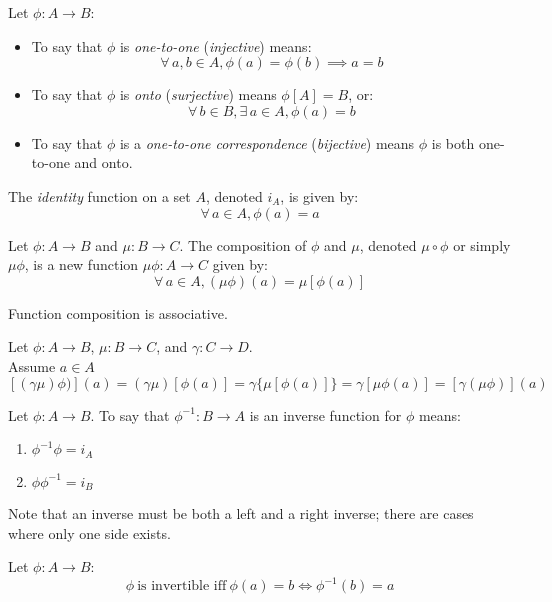 \documentclass[letterpaper,12pt,fleqn]{article}
\begin{document}
\begin{definition}
Let $\phi:A\to B$:
\begin{itemize}
\item To say that $\phi$ is \emph{one-to-one} (\emph{injective}) means:
\[\forall\,a,b\in A,\phi(a)=\phi(b)\implies a=b\]
\item To say that $\phi$ is \emph{onto} (\emph{surjective}) means $\phi[A]=B$,
or:
\[\forall\,b\in B,\exists\,a\in A,\phi(a)=b\]
\item To say that $\phi$ is a \emph{one-to-one correspondence}
(\emph{bijective}) means $\phi$ is both one-to-one and onto.
\end{itemize}
\end{definition}
\begin{definition}
The \emph{identity} function on a set $A$, denoted $i_A$, is given by:
\[\forall\,a\in A,\phi(a)=a\]
\end{definition}
\begin{definition}
Let $\phi:A\to B$ and $\mu:B\to C$. The composition of $\phi$ and $\mu$,
denoted $\mu\circ\phi$ or simply $\mu\phi$, is a new function $\mu\phi:A\to C$
given by:
\[\forall\,a\in A,(\mu\phi)(a)=\mu[\phi(a)]\]
\end{definition}
\begin{theorem}
Function composition is associative.
\end{theorem}
\begin{theproof}
Let $\phi:A\to B$, $\mu:B\to C$, and $\gamma:C\to D$. \\
Assume $a\in A$ \\
\[[(\gamma\mu)\phi)](a)=(\gamma\mu)[\phi(a)]=\gamma\{\mu[\phi(a)]\}=
    \gamma[\mu\phi(a)]=[\gamma(\mu\phi)](a)\]
\end{theproof}
\begin{definition}
Let $\phi:A\to B$. To say that $\phi^{-1}:B\to A$ is an inverse function for
$\phi$ means:
\begin{enumerate}
\item $\phi^{-1}\phi=i_A$
\item $\phi\phi^{-1}=i_B$
\end{enumerate}
Note that an inverse must be both a left and a right inverse; there are cases
where only one side exists.
\end{definition}
\begin{theorem}
Let $\phi:A\to B$:
\[\phi\ \mbox{is invertible iff}\ \phi(a)=b\iff\phi^{-1}(b)=a\]
\end{theorem}
\end{document}
